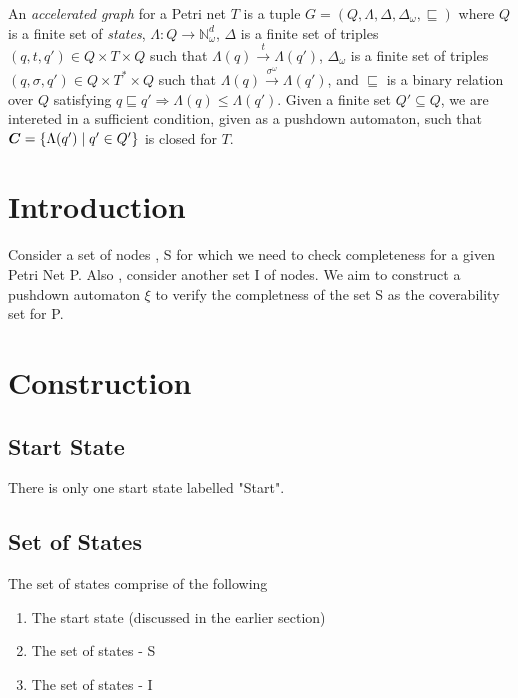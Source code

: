 \documentclass[a4paper,10pt]{article}
\newcommand{\setN}{\mathbb{N}}
\def\vec#1{\mathchoice{\mbox{\boldmath$\displaystyle#1$}}
{\mbox{\boldmath$\textstyle#1$}}
{\mbox{\boldmath$\scriptstyle#1$}}
{\mbox{\boldmath$\scriptscriptstyle#1$}}}
\begin{document}
\medskip


An \emph{accelerated graph} for a Petri net $T$ is a tuple $G=(Q,\Lambda,\Delta,\Delta_\omega,\sqsubseteq)$ where $Q$ is a finite set of \emph{states}, $\Lambda:Q\rightarrow\setN_\omega^d$, $\Delta$ is a finite set of triples $(q,t,q')\in Q\times T\times Q$ such that $\Lambda(q)\xrightarrow{t}\Lambda(q')$, $\Delta_\omega$ is a finite set of triples $(q,\sigma,q')\in Q\times T^*\times Q$ such that $\Lambda(q)\xrightarrow{\sigma^\omega}\Lambda(q')$, and $\sqsubseteq$ is a binary relation over $Q$ satisfying $q\sqsubseteq q'\Rightarrow\Lambda(q)\leq \Lambda(q')$. Given a finite set $Q'\subseteq Q$, we are intereted in a sufficient condition, given as a pushdown automaton, such that $\vec{C}=\{\Lambda(q') \mid q'\in Q'\}$ is closed for $T$.



\section{Introduction}
  Consider a set of nodes , S for which we need to check completeness for a given Petri Net P. Also , consider 
  another set I of nodes.
  We aim to construct a pushdown automaton $\xi$  to verify the completness of the set S as the coverability 
  set for P.  
  
\section{Construction}
  \subsection{Start State} 
    There is only one start state labelled "Start".
    \newline
    \begin{center}
    \end{center}
    
  \subsection{Set of States}
    The set of states comprise of the following
    \begin{enumerate}
      \item  The start state (discussed in the earlier section)
      \item  The set of states - S
      \item  The set of states - I
    \end{enumerate}
      
\end{document}
